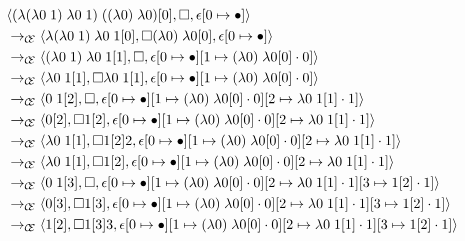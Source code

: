 \begin{figure}
\begin{align*}
&\langle (\lambda(\lambda0\;1)\;\lambda0\;1)\;((\lambda0)\;\lambda0)[0],\square,\epsilon[0\mapsto\bullet]\rangle\\
&\rightarrow_{\mathcal{\mathcal{C} \mskip -4mu \mathcal{E}}}\langle \lambda(\lambda0\;1)\;\lambda0\;1[0],\square (\lambda0)\;\lambda0[0],\epsilon[0\mapsto\bullet]\rangle\\ 
&\rightarrow_{\mathcal{\mathcal{C} \mskip -4mu \mathcal{E}}}\langle (\lambda0\;1)\;\lambda0\;1[1],\square,\epsilon[0\mapsto\bullet][1\mapsto(\lambda0)\;\lambda0[0]\cdot0]\rangle\\ 
&\rightarrow_{\mathcal{\mathcal{C} \mskip -4mu \mathcal{E}}}\langle \lambda0\;1[1],\square \lambda0\;1[1],\epsilon[0\mapsto\bullet][1\mapsto(\lambda0)\;\lambda0[0]\cdot0]\rangle\\ 
&\rightarrow_{\mathcal{\mathcal{C} \mskip -4mu \mathcal{E}}}\langle 0\;1[2],\square,\epsilon[0\mapsto\bullet][1\mapsto(\lambda0)\;\lambda0[0]\cdot0][2\mapsto\lambda0\;1[1]\cdot1]\rangle\\ 
&\rightarrow_{\mathcal{\mathcal{C} \mskip -4mu \mathcal{E}}}\langle 0[2],\square 1[2],\epsilon[0\mapsto\bullet][1\mapsto(\lambda0)\;\lambda0[0]\cdot0][2\mapsto\lambda0\;1[1]\cdot1]\rangle\\ 
&\rightarrow_{\mathcal{\mathcal{C} \mskip -4mu \mathcal{E}}}\langle \lambda0\;1[1],\square 1[2] 2,\epsilon[0\mapsto\bullet][1\mapsto(\lambda0)\;\lambda0[0]\cdot0][2\mapsto\lambda0\;1[1]\cdot1]\rangle\\ 
&\rightarrow_{\mathcal{\mathcal{C} \mskip -4mu \mathcal{E}}}\langle \lambda0\;1[1],\square 1[2],\epsilon[0\mapsto\bullet][1\mapsto(\lambda0)\;\lambda0[0]\cdot0][2\mapsto\lambda0\;1[1]\cdot1]\rangle\\ 
&\rightarrow_{\mathcal{\mathcal{C} \mskip -4mu \mathcal{E}}}\langle 0\;1[3],\square,\epsilon[0\mapsto\bullet][1\mapsto(\lambda0)\;\lambda0[0]\cdot0][2\mapsto\lambda0\;1[1]\cdot1][3\mapsto1[2]\cdot1]\rangle\\ 
&\rightarrow_{\mathcal{\mathcal{C} \mskip -4mu \mathcal{E}}}\langle 0[3],\square 1[3],\epsilon[0\mapsto\bullet][1\mapsto(\lambda0)\;\lambda0[0]\cdot0][2\mapsto\lambda0\;1[1]\cdot1][3\mapsto1[2]\cdot1]\rangle\\ 
&\rightarrow_{\mathcal{\mathcal{C} \mskip -4mu \mathcal{E}}}\langle 1[2],\square 1[3] 3,\epsilon[0\mapsto\bullet][1\mapsto(\lambda0)\;\lambda0[0]\cdot0][2\mapsto\lambda0\;1[1]\cdot1][3\mapsto1[2]\cdot1]\rangle\\ 

\end{align*}
\end{figure}
